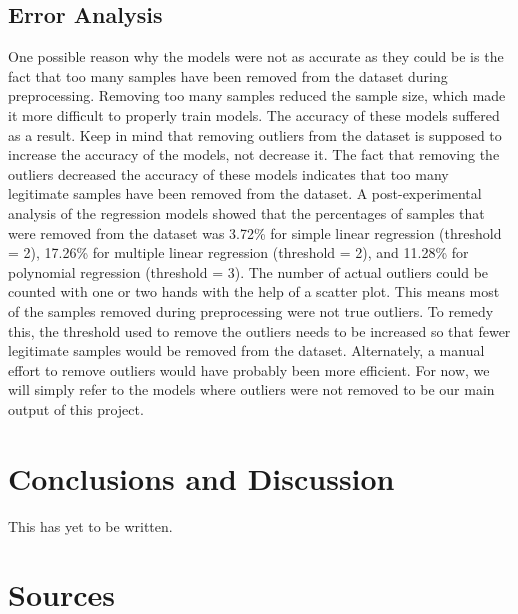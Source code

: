 \documentclass[12pt]{article}
\begin{document}
	\subsection{Error Analysis}
	
	One possible reason why the models were not as accurate as they could be is the fact that too many samples have been removed from the dataset during preprocessing. Removing too many samples reduced the sample size, which made it more difficult to properly train models. The accuracy of these models suffered as a result. Keep in mind that removing outliers from the dataset is supposed to increase the accuracy of the models, not decrease it. The fact that removing the outliers decreased the accuracy of these models indicates that too many legitimate samples have been removed from the dataset. A post-experimental analysis of the regression models showed that the percentages of samples that were removed from the dataset was 3.72\% for simple linear regression (threshold = 2), 17.26\% for multiple linear regression (threshold = 2), and 11.28\% for polynomial regression (threshold = 3). The number of actual outliers could be counted with one or two hands with the help of a scatter plot. This means most of the samples removed during preprocessing were not true outliers. To remedy this, the threshold used to remove the outliers needs to be increased so that fewer legitimate samples would be removed from the dataset. Alternately, a manual effort to remove outliers would have probably been more efficient. For now, we will simply refer to the models where outliers were not removed to be our main output of this project. 
	
	\section{Conclusions and Discussion}
	
	This has yet to be written.
	
	\section{Sources}
	
\end{document}

